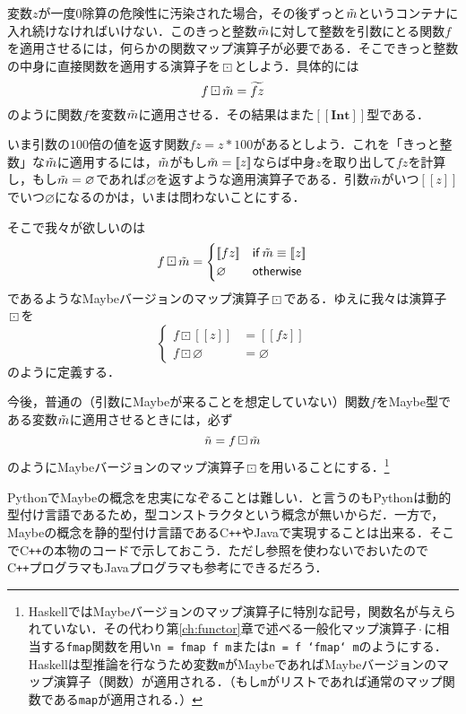 \documentclass[twocolumn]{jsbook}
\def\[{\left[\!\left[}
\def\]{\right]\!\right]}
\newcommand{\programminglanguage}[1]{\textsf{#1}}
\newcommand{\cxx}{\programminglanguage{C}\texttt{++}}
\newcommand{\haskell}{\programminglanguage{Haskell}}
\newcommand{\python}{\programminglanguage{Python}}
\newcommand{\code}[1]{\texttt{#1}}
\newcommand{\hsklType}[1]{\textbf{#1}}
\DeclareMathOperator{\hsklFmap}{\cdot}
\DeclareMathOperator{\hsklMaybeMap}{\boxdot}
\newcommand{\hsklNothing}{\varnothing}
\newcommand{\hsklInt}{\hsklType{Int}}
\newcommand{\hsklJust}[1]{\[#1\]}
\newcommand{\hsklMaybeType}[1]{\[#1\]}
\newcommand{\hsklMaybe}[1]{\Tilde{#1}}
\newcommand{\hsklMaybeW}[1]{\widetilde{#1}}
\newcommand{\mathKeyword}[1]{\mathsf{#1}}
\DeclareMathOperator{\mathIf}{\mathKeyword{if}}
\newcommand{\mathOtherwise}{\mathKeyword{otherwise}}
\begin{document}
変数$z$が一度$0$除算の危険性に汚染された場合，その後ずっと$\hsklMaybe{m}$というコンテナに入れ続けなければいけない．このきっと整数$\hsklMaybe{m}$に対して整数を引数にとる関数$f$を適用させるには，何らかの関数マップ演算子が必要である．そこできっと整数の中身に直接関数を適用する演算子を$\hsklMaybeMap$としよう．具体的には$$f\hsklMaybeMap\hsklMaybe{m}=\hsklMaybeW{fz}$$のように関数$f$を変数$\hsklMaybe{m}$に適用させる．その結果はまた$\hsklMaybeType{\hsklInt}$型である．

いま引数の$100$倍の値を返す関数$fz=z*100$があるとしよう．これを「きっと整数」な$\hsklMaybe{m}$に適用するには，$\hsklMaybe{m}$がもし$\hsklMaybe{m}=\hsklJust{z}$ならば中身$z$を取り出して$fz$を計算し，もし$\hsklMaybe{m}=\hsklNothing$であれば$\hsklNothing$を返すような適用演算子である．引数$\hsklMaybe{m}$がいつ$\hsklJust{z}$でいつ$\hsklNothing$になるのかは，いまは問わないことにする．

そこで我々が欲しいのは
\begin{equation*}
f\hsklMaybeMap\hsklMaybe{m}=\begin{cases}
\hsklJust{fz}&\mathIf\hsklMaybe{m}\equiv\hsklJust{z}\\
\hsklNothing&\mathOtherwise
\end{cases}
\end{equation*}
であるようなMaybeバージョンのマップ演算子$\hsklMaybeMap$である．ゆえに我々は演算子$\hsklMaybeMap$を
\begin{equation*}
\left\{
\begin{split}
f\hsklMaybeMap\hsklJust{z}&=\hsklJust{fz}\\
f\hsklMaybeMap\hsklNothing&=\hsklNothing
\end{split}
\right.
\end{equation*}
のように定義する．

今後，普通の（引数にMaybeが来ることを想定していない）関数$f$をMaybe型である変数$\hsklMaybe{m}$に適用させるときには，必ず$$\hsklMaybe{n}=f\hsklMaybeMap\hsklMaybe{m}$$のようにMaybeバージョンのマップ演算子$\hsklMaybeMap$を用いることにする．\footnote{\haskell ではMaybeバージョンのマップ演算子に特別な記号，関数名が与えられていない．その代わり第\ref{ch:functor}章で述べる一般化マップ演算子$\hsklFmap$に相当する\code{fmap}関数を用い\code{n = fmap f m}または\code{n = f `fmap` m}のようにする．\haskell は型推論を行なうため変数\code{m}がMaybeであればMaybeバージョンのマップ演算子（関数）が適用される．（もし\code{m}がリストであれば通常のマップ関数である\code{map}が適用される．）}

\python でMaybeの概念を忠実になぞることは難しい．と言うのも\python は動的型付け言語であるため，型コンストラクタという概念が無いからだ．一方で，Maybeの概念を静的型付け言語である\cxx やJavaで実現することは出来る．そこで\cxx の本物のコードで示しておこう．ただし参照を使わないでおいたので\cxx プログラマもJavaプログラマも参考にできるだろう．
\end{document}
